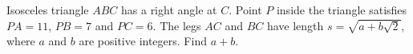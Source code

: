Isosceles triangle $ABC$ has a right angle at $C$. Point $P$ inside the triangle satisfies $PA=11$, $PB=7$ and $PC=6$. The legs $AC$ and $BC$ have length $s=\sqrt{a+b\sqrt2}$, where $a$ and $b$ are positive integers. Find $a+b$.
